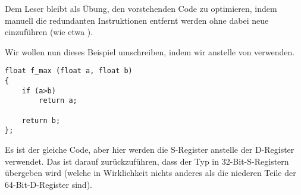 \mysubparagraph{\Exercise}
Dem Leser bleibt als Übung, den vorstehenden Code zu optimieren, indem manuell die redundanten Instruktionen entfernt
werden ohne dabei neue einzuführen (wie etwa ).

Wir wollen nun dieses Beispiel umschreiben, indem wir \Tfloat anstelle von \Tdouble verwenden.

\begin{lstlisting}[style=customc]
float f_max (float a, float b)
{
	if (a>b)
		return a;

	return b;
};
\end{lstlisting}


Es ist der gleiche Code, aber hier werden die S-Register anstelle der D-Register verwendet.
Das ist darauf zurückzuführen, dass der \Tfloat Typ in 32-Bit-S-Registern übergeben wird (welche in Wirklichkeit nichts
anderes als die niederen Teile der 64-Bit-D-Register sind).

